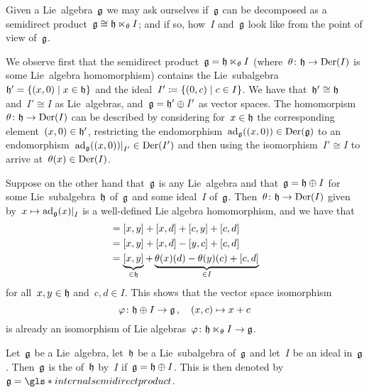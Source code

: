 \begin{remark}
  Given a Lie~algebra~$\mathfrak{g}$ we may ask ourselves if~$\mathfrak{g}$ can be decomposed as a semidirect product~$\mathfrak{g} \cong \mathfrak{h} \ltimes_\theta I$;
  and if so, how~$I$ and~$\mathfrak{g}$ look like from the point of view of~$\mathfrak{g}$.
  
  We observe first that the semidirect product~$\mathfrak{g} = \mathfrak{h} \ltimes_\theta I$ (where~$\theta \colon \mathfrak{h} \to \operatorname{Der}(I)$ is some Lie~algebra homomorphism) contains the Lie~subalgebra~$\hlie' = \{ (x,0) \suchthat x \in \hlie \}$ and the ideal~$I' \defined \{ (0,c) \suchthat c \in I \}$.
  We have that~$\mathfrak{h}' \cong \mathfrak{h}$ and~$I' \cong I$ as Lie~algebras, and~$\mathfrak{g} = \mathfrak{h}' \oplus I'$ as vector spaces.
  The homomorpism~$\theta \colon \mathfrak{h} \to \operatorname{Der}(I)$ can be described by considering for~$x \in \mathfrak{h}$ the corresponding element~$(x,0) \in \mathfrak{h}'$, restricting the endomorphism~$\operatorname{ad}_{\mathfrak{g}}((x,0)) \in \operatorname{Der}(\mathfrak{g})$ to an endomorphism~$\restrict{ \ad_{\glie}((x,0)) }{I'} \in \Der(I')$ and then using the isomorphism~$I' \cong I$ to arrive at~$\theta(x) \in \operatorname{Der}(I)$.
  
  Suppose on the other hand that~$\mathfrak{g}$ is any Lie~algebra and that~$\mathfrak{g} = \mathfrak{h} \oplus I$ for some Lie~subalgebra~$\mathfrak{h}$ of~$\mathfrak{g}$ and some ideal~$I$ of~$\mathfrak{g}$.
  Then~$\theta \colon \mathfrak{h} \to \operatorname{Der}(I)$ given by~$x \mapsto \restrict{\ad_{\glie}(x)}{I}$ is a well-defined Lie algebra homomorphism, and we have that
  \begin{align*}
    [x + c, y + d]
    &=
    [x,y] + [x,d] + [c,y] + [c,d]
    \\
    &=
    [x,y] + [x,d] - [y,c] + [c,d]
    \\
    &=
    \underbrace{ [x,y] }_{\in \hlie} + \underbrace{ \theta(x)(d) - \theta(y)(c) + [c,d] }_{\in I}
  \end{align*}
  for all~$x, y \in \mathfrak{h}$ and~$c, d \in I$.
  This shows that the vector space isomorphism
  \[
    \varphi
    \colon
    \mathfrak{h} \oplus I
    \to
    \mathfrak{g} \,,
    \quad
    (x,c)
    \mapsto
    x + c
  \]
  is already an isomorphism of Lie algebras~$\varphi \colon \mathfrak{h} \ltimes_\theta I \to \mathfrak{g}$.
\end{remark}


\begin{definition}
  Let~$\mathfrak{g}$ be a Lie~algebra, let~$\mathfrak{h}$ be a Lie~subalgebra of~$\mathfrak{g}$ and let~$I$ be an ideal in~$\mathfrak{g}$.
  Then~$\mathfrak{g}$ is the  of~$\mathfrak{h}$ by~$I$ if~$\mathfrak{g} = \mathfrak{h} \oplus I$.
  This is then denoted by~$\glie = \gls*{internal semidirect product}$.
\end{definition}


